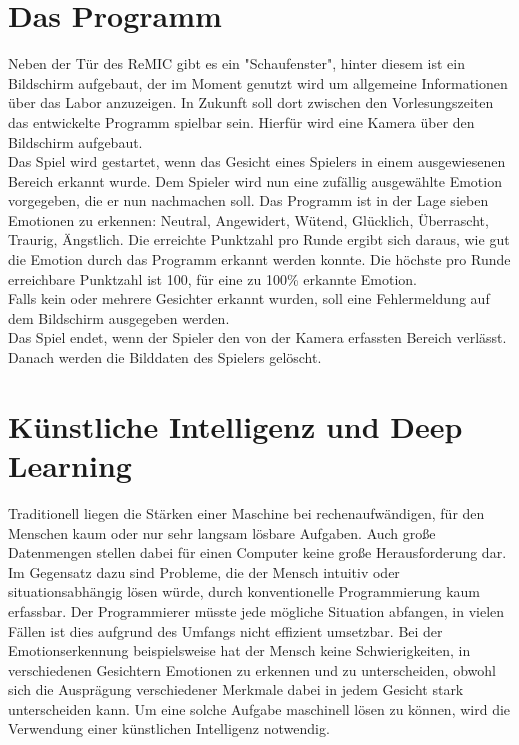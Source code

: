 \documentclass[12pt,a4paper,headinclude,twoside, plainheadsepline, open=right,numbers=noenddot]{scrreprt}
\begin{document}
\section{Das Programm}
Neben der Tür des ReMIC gibt es ein "{}Schaufenster"{}, hinter diesem ist ein Bildschirm aufgebaut, der im Moment genutzt wird um allgemeine Informationen über das Labor anzuzeigen. In Zukunft soll dort zwischen den Vorlesungszeiten das entwickelte Programm spielbar sein. Hierfür wird eine Kamera über den Bildschirm aufgebaut. 
\\
Das Spiel wird gestartet, wenn das Gesicht eines Spielers in einem ausgewiesenen Bereich erkannt wurde. Dem Spieler wird nun eine zufällig ausgewählte Emotion vorgegeben, die er nun nachmachen soll. Das Programm ist in der Lage sieben Emotionen zu erkennen:  Neutral, Angewidert, Wütend, Glücklich, Überrascht, Traurig, Ängstlich. Die erreichte Punktzahl pro Runde ergibt sich daraus, wie gut die Emotion durch das Programm erkannt werden konnte. Die höchste pro Runde erreichbare Punktzahl ist 100, für eine zu 100\% erkannte Emotion. \\ Falls kein oder mehrere Gesichter erkannt wurden, soll eine Fehlermeldung auf dem Bildschirm ausgegeben werden. \\ Das Spiel endet, wenn der Spieler den von der Kamera erfassten Bereich verlässt. Danach werden die Bilddaten des Spielers gelöscht. 


\section{Künstliche Intelligenz und Deep Learning}
Traditionell liegen die Stärken einer Maschine bei rechenaufwändigen, für den Menschen kaum oder nur sehr langsam lösbare Aufgaben. Auch große Datenmengen stellen dabei für einen Computer keine große Herausforderung dar. Im Gegensatz dazu sind Probleme, die der Mensch intuitiv oder situationsabhängig lösen würde, durch konventionelle Programmierung kaum erfassbar. Der Programmierer müsste jede mögliche Situation abfangen, in vielen Fällen ist dies aufgrund des Umfangs nicht effizient umsetzbar. Bei der Emotionserkennung  beispielsweise hat der Mensch keine Schwierigkeiten, in verschiedenen Gesichtern Emotionen zu erkennen und zu unterscheiden, obwohl sich die Ausprägung verschiedener Merkmale dabei in jedem Gesicht stark unterscheiden kann. Um eine solche Aufgabe maschinell lösen zu können, wird die Verwendung einer künstlichen Intelligenz notwendig. 
\end{document}
